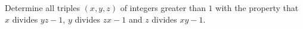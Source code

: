 \documentclass{subfile}
\begin{document}
%
%
%
%
%
%

	\begin{problem}
		Determine all triples $(x,y,z)$ of integers greater than $1$ with the property that $x$ divides $yz-1$, $y$ divides $zx-1$ and $z$ divides $xy-1$. %
	\end{problem}

%
\end{document}
